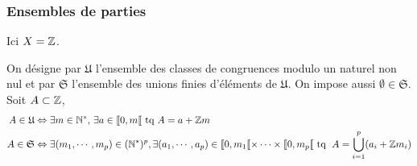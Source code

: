 \subsubsection{Ensembles de parties}
Ici $X = \mathbb{Z}$.
\begin{defi}
On désigne par $\mathfrak{U}$ l'ensemble des classes de congruences modulo un naturel non nul et par $\mathfrak{S}$ l'ensemble des unions finies d'éléments de $\mathfrak{U}$. On impose aussi $\emptyset \in \mathfrak{S}$.\newline
  Soit $A \subset \mathbb{Z}$, 
  \begin{align*}
 A \in \mathfrak{U}  &\Leftrightarrow \exists m\in \mathbb{N}^*,\, \exists a \in \llbracket 0, m \llbracket \text{ tq } A = a + \mathbb{Z} m \\
 A\in \mathfrak{S} &\Leftrightarrow \exists (m_1,\cdots,m_p) \in (\mathbb{N}^*)^p, \exists (a_1,\cdots,a_p)\in \llbracket 0,m_1\llbracket \times \dots \times \llbracket 0,m_p\llbracket \text{ tq }\;
 A = \bigcup_{i=1}^{p}(a_i + \mathbb{Z} m_i)
  \end{align*}
\end{defi}


